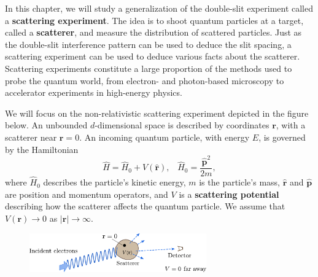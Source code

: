 \documentclass[pra,12pt]{revtex4}
\begin{document}
In this chapter, we will study a generalization of the double-slit
experiment called a \textbf{scattering experiment}.  The idea is to
shoot quantum particles at a target, called a \textbf{scatterer}, and
measure the distribution of scattered particles.  Just as the
double-slit interference pattern can be used to deduce the slit
spacing, a scattering experiment can be used to deduce various facts
about the scatterer.  Scattering experiments constitute a large
proportion of the methods used to probe the quantum world, from
electron- and photon-based microscopy to accelerator experiments in
high-energy physics.

We will focus on the non-relativistic scattering experiment depicted
in the figure below.  An unbounded $d$-dimensional space is described
by coordinates $\mathbf{r}$, with a scatterer near $\mathbf{r} = 0$.
An incoming quantum particle, with energy $E$, is governed by the
Hamiltonian
\begin{equation}
  \hat{H} = \hat{H}_0 + V(\hat{\mathbf{r}}), \;\;\;
  \hat{H}_0 = \frac{\hat{\mathbf{p}}^2}{2m},
\end{equation}
where $\hat{H}_0$ describes the particle's kinetic energy, $m$ is the
particle's mass, $\hat{\mathbf{r}}$ and $\hat{\mathbf{p}}$ are
position and momentum operators, and $V$ is a \textbf{scattering
  potential} describing how the scatterer affects the quantum
particle.  We assume that $V(\mathbf{r}) \rightarrow 0$ as
$|\mathbf{r}| \rightarrow \infty$.

\begin{figure}[h]
  \centering\includegraphics[width=0.68\textwidth]{scattering}
\end{figure}
\end{document}
